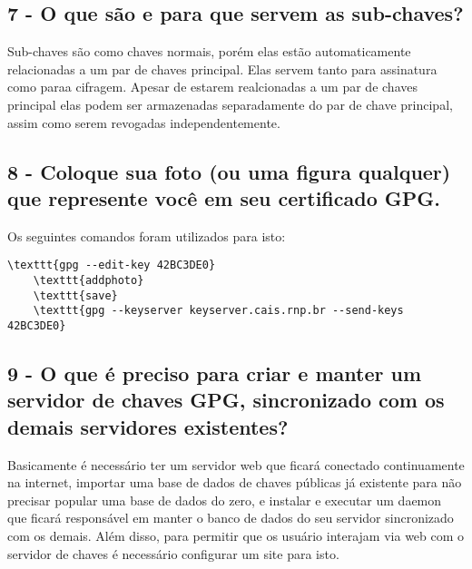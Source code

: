 \documentclass[
    article,            %
    11pt,               %
    oneside,            %
    a4paper,            %
    english,            %
    brazil,             %
    sumario=tradicional,
    ]{abntex2}
\begin{document}
\subsection*{\textbf{7 - O que são e para que servem as sub-chaves?}}

Sub-chaves são como chaves normais, porém elas estão automaticamente relacionadas a um par de chaves principal. Elas servem tanto para assinatura como paraa cifragem. Apesar de estarem realcionadas a um par de chaves principal elas podem ser armazenadas separadamente do par de chave principal, assim como serem revogadas independentemente.

\subsection*{\textbf{8 - Coloque sua foto (ou uma figura qualquer) que represente você em seu certificado GPG.}}

Os seguintes comandos foram utilizados para isto: 
\begin{Verbatim}[commandchars=\\\{\}, fontsize=\footnotesize]
    \texttt{gpg --edit-key 42BC3DE0}
    \texttt{addphoto}
    \texttt{save}
    \texttt{gpg --keyserver keyserver.cais.rnp.br --send-keys 42BC3DE0}
\end{Verbatim}


\subsection*{\textbf{9 - O que é preciso para criar e manter um servidor de chaves GPG, sincronizado com os demais servidores existentes?}}

Basicamente é necessário ter um servidor web que ficará conectado continuamente na internet, importar uma base de dados de chaves públicas já existente para não precisar popular uma base de dados do zero, e instalar e executar um daemon que ficará responsável em manter o banco de dados do seu servidor sincronizado com os demais. Além disso, para permitir que os usuário interajam via web com o servidor de chaves é necessário configurar um site para isto.
\end{document}
